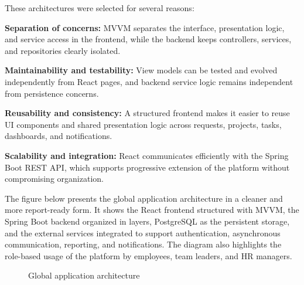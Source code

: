 {\fontsize{12}{18}\selectfont
\setlength{\parindent}{1.2cm}
\setlength{\parskip}{6pt}

\indent These architectures were selected for several reasons:

\begin{itemize}[leftmargin=2cm, itemsep=4pt]
  {\fontsize{12}{18}\selectfont
  \item \textbf{Separation of concerns:} MVVM separates the interface, presentation logic, and service access in the frontend, while the backend keeps controllers, services, and repositories clearly isolated.
  \item \textbf{Maintainability and testability:} View models can be tested and evolved independently from React pages, and backend service logic remains independent from persistence concerns.
  \item \textbf{Reusability and consistency:} A structured frontend makes it easier to reuse UI components and shared presentation logic across requests, projects, tasks, dashboards, and notifications.
  \item \textbf{Scalability and integration:} React communicates efficiently with the Spring Boot REST API, which supports progressive extension of the platform without compromising organization.
  }
\end{itemize}

}

\vspace{6pt}


{\fontsize{12}{18}\selectfont
\setlength{\parindent}{1.2cm}
\setlength{\parskip}{6pt}

\indent The figure below presents the global application architecture in a cleaner and more report-ready form. It shows the React frontend structured with MVVM, the Spring Boot backend organized in layers, PostgreSQL as the persistent storage, and the external services integrated to support authentication, asynchronous communication, reporting, and notifications. The diagram also highlights the role-based usage of the platform by employees, team leaders, and HR managers.

}

\vspace{6pt}

\begin{figure}[H]
\centering
{}
\caption{Global application architecture}
\end{figure}

